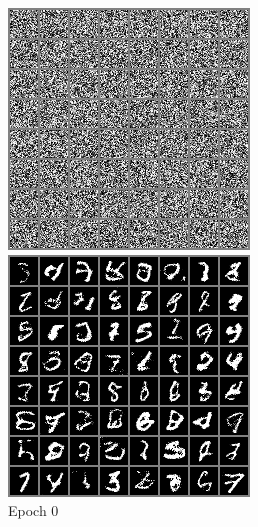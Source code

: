 \documentclass{article}
\begin{document}
\begin{figure}[H]
    \centering
    \begin{minipage}{0.3\textwidth}
        \centering
        \includegraphics[width=\textwidth]{images/epoch_0_samples.png}
        \caption{Epoch 0}
        \label{fig:epoch_0}
    \end{minipage}
    \hfill
    \begin{minipage}{0.3\textwidth}
        \centering
        \includegraphics[width=\textwidth]{images/epoch_10_samples.png}

\end{minipage}
\end{figure}
\end{document}
